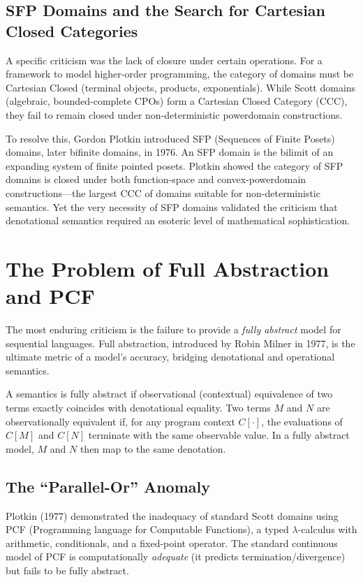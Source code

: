 \documentclass[11pt]{article}
\begin{document}
\subsection{SFP Domains and the Search for Cartesian Closed Categories}

A specific criticism was the lack of closure under certain operations. For a framework
to model higher-order programming, the category of domains must be Cartesian Closed
(terminal objects, products, exponentials). While Scott domains (algebraic,
bounded-complete CPOs) form a Cartesian Closed Category (CCC), they fail to remain
closed under non-deterministic powerdomain constructions.

To resolve this, Gordon Plotkin introduced SFP (Sequences of Finite Posets) domains,
later bifinite domains, in 1976. An SFP domain is the bilimit of an expanding system of
finite pointed posets. Plotkin showed the category of SFP domains is closed under both
function-space and convex-powerdomain constructions---the largest CCC of domains
suitable for non-deterministic semantics. Yet the very necessity of SFP domains
validated the criticism that denotational semantics required an esoteric level of
mathematical sophistication.

\section{The Problem of Full Abstraction and PCF}

The most enduring criticism is the failure to provide a \emph{fully abstract} model for
sequential languages. Full abstraction, introduced by Robin Milner in 1977, is the
ultimate metric of a model's accuracy, bridging denotational and operational semantics.

A semantics is fully abstract if observational (contextual) equivalence of two terms
exactly coincides with denotational equality. Two terms $M$ and $N$ are observationally
equivalent if, for any program context $C[\cdot]$, the evaluations of $C[M]$ and $C[N]$
terminate with the same observable value. In a fully abstract model, $M$ and $N$ then
map to the same denotation.

\subsection{The ``Parallel-Or'' Anomaly}

Plotkin (1977) demonstrated the inadequacy of standard Scott domains using PCF
(Programming language for Computable Functions), a typed $\lambda$-calculus with
arithmetic, conditionals, and a fixed-point operator. The standard continuous model of
PCF is computationally \emph{adequate} (it predicts termination/divergence) but fails to
be fully abstract.
\end{document}
